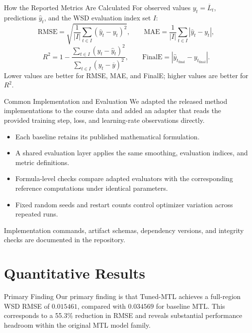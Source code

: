 \documentclass[aspectratio=169]{beamer}
\begin{document}
\begin{frame}{How the Reported Metrics Are Calculated}
  For observed values \(y_t=\overline L_t\), predictions \(\widehat y_t\), and the WSD evaluation index set \(I\):
  \[
    \mathrm{RMSE}
      =\sqrt{\frac{1}{|I|}\sum_{t\in I}(\widehat y_t-y_t)^2},
    \qquad
    \mathrm{MAE}
      =\frac{1}{|I|}\sum_{t\in I}|\widehat y_t-y_t|,
  \]
  \[
    R^2
      =1-\frac{\sum_{t\in I}(y_t-\widehat y_t)^2}
      {\sum_{t\in I}(y_t-\overline y)^2},
    \qquad
    \mathrm{FinalE}=|\widehat y_{t_{\mathrm{final}}}-y_{t_{\mathrm{final}}}|.
  \]
  Lower values are better for RMSE, MAE, and FinalE; higher values are better for \(R^2\).
\end{frame}

\begin{frame}{Common Implementation and Evaluation}
  We adapted the released method implementations to the course data and added an adapter that reads the provided training step, loss, and learning-rate observations directly.
  \begin{itemize}
    \item Each baseline retains its published mathematical formulation.
    \item A shared evaluation layer applies the same smoothing, evaluation indices, and metric definitions.
    \item Formula-level checks compare adapted evaluators with the corresponding reference computations under identical parameters.
    \item Fixed random seeds and restart counts control optimizer variation across repeated runs.
  \end{itemize}
  Implementation commands, artifact schemas, dependency versions, and integrity checks are documented in the repository.
\end{frame}

\section{Quantitative Results}

\begin{frame}{Primary Finding}
  Our primary finding is that Tuned-MTL achieves a full-region WSD RMSE of
  \(0.015461\), compared with \(0.034569\) for baseline MTL. This corresponds
  to a 55.3\% reduction in RMSE and reveals substantial performance headroom
  within the original MTL model family.
\end{frame}
\end{document}
